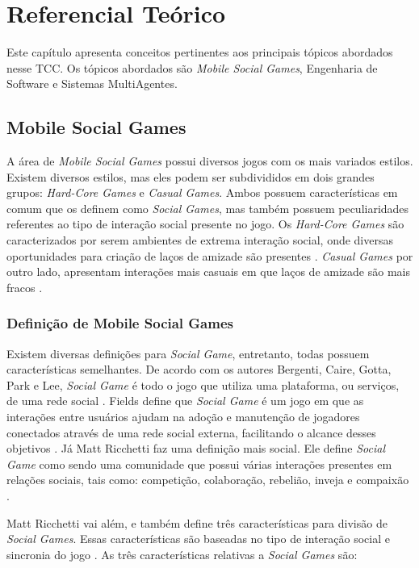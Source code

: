 \chapter[Referencial Teórico]{Referencial Teórico}

Este capítulo apresenta conceitos pertinentes aos principais tópicos abordados nesse TCC. Os tópicos abordados são \textit{Mobile Social Games}, Engenharia de Software e Sistemas MultiAgentes.

\section{Mobile Social Games}
A área de \textit{Mobile Social Games} possui diversos jogos com os mais variados estilos.
Existem diversos estilos, mas eles podem ser subdivididos em dois grandes grupos: \textit{Hard-Core Games} e \textit{Casual Games}. Ambos possuem características em comum que os definem como \textit{Social Games}, mas também possuem peculiaridades referentes ao tipo de interação social presente no jogo. Os \textit{Hard-Core Games} são caracterizados por serem ambientes de extrema interação social, onde diversas oportunidades para criação de laços de amizade são presentes \cite{cole2007}. \textit{Casual Games} por outro lado, apresentam interações mais casuais em que laços de amizade são mais fracos \cite{ricchetti2015}.

    \subsection{Definição de Mobile Social Games}
Existem diversas definições para \textit{Social Game}, entretanto, todas possuem características semelhantes. De acordo com os autores Bergenti, Caire, Gotta, Park e Lee, \textit{Social Game} é todo o jogo que utiliza uma plataforma, ou serviços, de uma rede social \cite{bergenti2013} \cite{park2012}. Fields define que \textit{Social Game} é um jogo em que as interações entre usuários ajudam na adoção e manutenção de jogadores conectados através de uma rede social externa, facilitando o alcance desses objetivos \cite{fields2014}. Já Matt Ricchetti faz uma definição mais social. Ele define \textit{Social Game} como sendo uma comunidade que possui várias interações presentes em relações sociais, tais como: competição, colaboração, rebelião, inveja e compaixão \cite{ricchetti2015}.

Matt Ricchetti vai além, e também define três características para divisão de \textit{Social Games}. Essas características são baseadas no tipo de interação social e sincronia do jogo \cite{ricchetti2015}. As três características relativas a \textit{Social Games} são:

